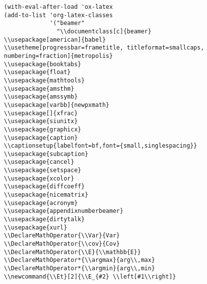 \documentclass[c]{article}
\DeclareMathOperator{\Var}{Var}
\DeclareMathOperator{\cov}{Cov}
\DeclareMathOperator{\E}{\mathbb{E}}
\DeclareMathOperator*{\argmax}{arg\,max}
\DeclareMathOperator*{\argmin}{arg\,min}
\newcommand{\Et}[2]{\E_{#2} \left[#1\right]}
\theoremstyle{plain}%
\theoremstyle{definition}
\theoremstyle{remark}
\begin{document}
\begin{verbatim}
(with-eval-after-load 'ox-latex
(add-to-list 'org-latex-classes
             '("beamer"
               "\\documentclass[c]{beamer}
\\usepackage[american]{babel}
\\usetheme[progressbar=frametitle, titleformat=smallcaps, numbering=fraction]{metropolis}
\\usepackage{booktabs}
\\usepackage{float}
\\usepackage{mathtools}
\\usepackage{amsthm}
\\usepackage{amssymb}
\\usepackage[varbb]{newpxmath}
\\usepackage[]{xfrac}
\\usepackage{siunitx}
\\usepackage{graphicx}
\\usepackage{caption}
\\captionsetup{labelfont=bf,font={small,singlespacing}}
\\usepackage{subcaption}
\\usepackage{cancel}
\\usepackage{setspace}
\\usepackage{xcolor}
\\usepackage{diffcoeff}
\\usepackage{nicematrix}
\\usepackage{acronym}
\\usepackage{appendixnumberbeamer}
\\usepackage{dirtytalk}
\\usepackage{xurl}
\\DeclareMathOperator{\\Var}{Var}
\\DeclareMathOperator{\\cov}{Cov}
\\DeclareMathOperator{\\E}{\\mathbb{E}}
\\DeclareMathOperator*{\\argmax}{arg\\,max}
\\DeclareMathOperator*{\\argmin}{arg\\,min}
\\newcommand{\\Et}[2]{\\E_{#2} \\left[#1\\right]}

\end{verbatim}
\end{document}
